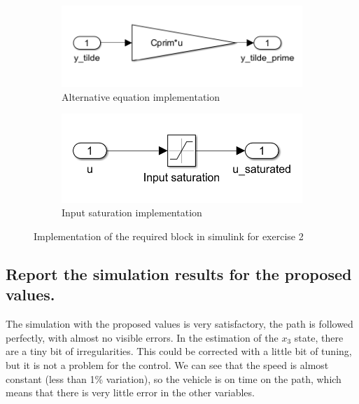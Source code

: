 \begin{figure}[H]
\begin{subfigure}[b]{0.45\textwidth}
         \centering
         \includegraphics[width=\textwidth]{Latex report/image/ex2altEq.png}
         \caption{Alternative equation implementation}
         \label{fig:altEqSim}
     \end{subfigure}
     \begin{subfigure}[b]{0.45\textwidth}
         \centering
         \includegraphics[width=\textwidth]{Latex report/image/ex2Saturation.png}
         \caption{Input saturation implementation}
         \label{fig:simSat}
     \end{subfigure}
    \caption{Implementation of the required block in simulink for exercise 2}
    \label{fig:simImplEx2}
\end{figure}

\subsection{Report the simulation results for the proposed values.}
The simulation with the proposed values is very satisfactory, the path is followed perfectly, with almost no visible errors. In the estimation of the $x_3$ state, there are a tiny bit of irregularities. This could be corrected with a little bit of tuning, but it is not a problem for the control. We can see that the speed is almost constant (less than 1\% variation), so the vehicle is on time on the path, which means that there is very little error in the other variables.

